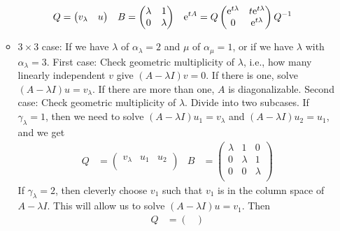 \documentclass[../notes.tex]{subfiles}
\begin{document}
\begin{itemize}
\begin{itemize}
        \begin{align*}
            Q &=
            \begin{pmatrix}
                v_\lambda & u\\
            \end{pmatrix}&
            B &=
            \begin{pmatrix}
                \lambda & 1\\
                0 & \lambda\\
            \end{pmatrix}&
            \e[tA] &= Q
            \begin{pmatrix}
                \e[t\lambda] & t\e[t\lambda]\\
                0 & \e[t\lambda]\\
            \end{pmatrix}
            Q^{-1}
        \end{align*}
        \item $3\times 3$ case: If we have $\lambda$ of $\alpha_\lambda=2$ and $\mu$ of $\alpha_\mu=1$, or if we have $\lambda$ with $\alpha_\lambda=3$. First case: Check geometric multiplicity of $\lambda$, i.e., how many linearly independent $v$ give $(A-\lambda I)v=0$. If there is one, solve $(A-\lambda I)u=v_\lambda$. If there are more than one, $A$ is diagonalizable. Second case: Check geometric multiplicity of $\lambda$. Divide into two subcases. If $\gamma_\lambda=1$, then we need to solve $(A-\lambda I)u_1=v_\lambda$ and $(A-\lambda I)u_2=u_1$, and we get
        \begin{align*}
            Q &=
            \begin{pmatrix}
                v_\lambda & u_1 & u_2\\
            \end{pmatrix}&
            B &=
            \begin{pmatrix}
                \lambda & 1 & 0\\
                0 & \lambda & 1\\
                0 & 0 & \lambda\\
            \end{pmatrix}
        \end{align*}
        If $\gamma_\lambda=2$, then cleverly choose $v_1$ such that $v_1$ is in the column space of $A-\lambda I$. This will allow us to solve $(A-\lambda I)u=v_1$. Then
        \begin{align*}
            Q &=
            \begin{pmatrix}

\end{pmatrix}
\end{align*}
\end{itemize}
\end{itemize}
\end{document}
